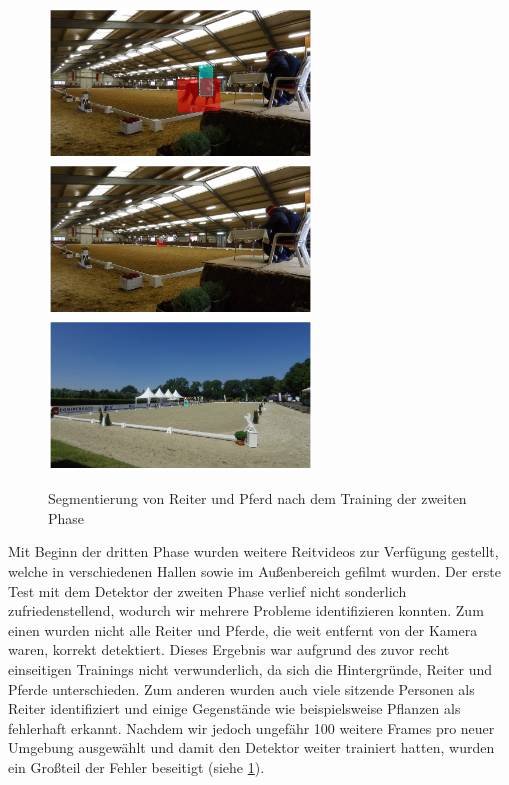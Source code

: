 \begin{figure}[b]
\centering
\includegraphics[height=4cm,trim={6cm 0 6cm 0},clip]{./img/IndoorMask6.png}
\includegraphics[height=4cm,trim={6cm 0 6cm 0},clip]{./img/IndoorMask3.png}
\includegraphics[height=4cm,trim={6cm 0 6cm 0},clip]{./img/OutdoorMask2.png}
\caption{Segmentierung von Reiter und Pferd nach dem Training der zweiten Phase}
\label{fig:SegmentierungPhase3}
\end{figure}

Mit Beginn der dritten Phase wurden weitere Reitvideos zur Verfügung gestellt, welche in verschiedenen Hallen sowie im Außenbereich gefilmt wurden. Der erste Test mit dem Detektor der zweiten Phase verlief nicht sonderlich zufriedenstellend, wodurch wir mehrere Probleme identifizieren konnten. Zum einen wurden nicht alle Reiter und Pferde, die weit entfernt von der Kamera waren, korrekt detektiert. Dieses Ergebnis war aufgrund des zuvor recht einseitigen Trainings nicht verwunderlich, da sich die Hintergründe, Reiter und Pferde unterschieden. Zum anderen wurden auch viele sitzende Personen als Reiter identifiziert und einige Gegenstände wie beispielsweise Pflanzen als fehlerhaft erkannt. Nachdem wir jedoch ungefähr 100 weitere Frames pro neuer Umgebung ausgewählt und damit den Detektor weiter trainiert hatten, wurden ein Großteil der Fehler beseitigt (siehe \ref{fig:SegmentierungPhase3}).


